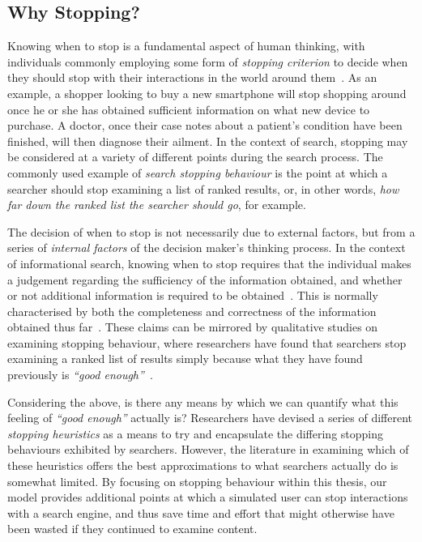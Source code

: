 \subsection{Why Stopping?}
 Knowing when to stop is a fundamental aspect of human thinking, with individuals commonly employing some form of \emph{stopping criterion} to decide when they should stop with their interactions in the world around them~\citep{nickles1995judgment}. As an example, a shopper looking to buy a new smartphone will stop shopping around once he or she has obtained sufficient information on what new device to purchase. A doctor, once their case notes about a patient's condition have been finished, will then diagnose their ailment. In the context of search, stopping may be considered at a variety of different points during the search process. The commonly used example of \emph{search stopping behaviour} is the point at which a searcher should stop examining a list of ranked results, or, in other words, \emph{how far down the ranked list the searcher should go}, for example.

The decision of when to stop is not necessarily due to external factors, but from a series of \emph{internal factors} of the decision maker's thinking process. In the context of informational search, knowing when to stop requires that the individual makes a judgement regarding the sufficiency of the information obtained, and whether or not additional information is required to be obtained~\citep{browne2004stopping_rules}. This is normally characterised by both the completeness and correctness of the information obtained thus far~\citep{smith1991belief}. These claims can be mirrored by qualitative studies on examining stopping behaviour, where researchers have found that searchers stop examining a ranked list of results simply because what they have found previously is \emph{``good enough''}~\citep{wu2014information_scent}.

Considering the above, is there any means by which we can quantify what this feeling of \emph{``good enough''} actually is? Researchers have devised a series of different \emph{stopping heuristics} as a means to try and encapsulate the differing stopping behaviours exhibited by searchers. However, the literature in examining which of these heuristics offers the best approximations to what searchers actually do is somewhat limited. By focusing on stopping behaviour within this thesis, our model provides additional points at which a simulated user can stop interactions with a search engine, and thus save time and effort that might otherwise have been wasted if they continued to examine content.

